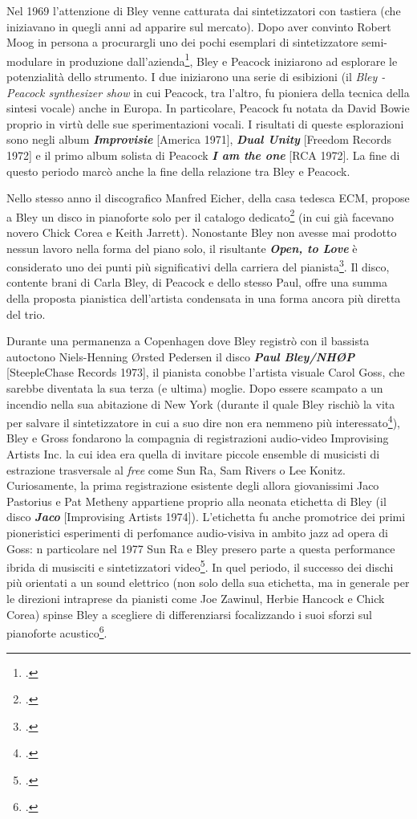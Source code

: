 Nel 1969 l'attenzione di Bley venne catturata dai sintetizzatori con tastiera (che iniziavano in quegli anni ad apparire sul mercato). Dopo aver convinto Robert Moog in persona a procurargli uno dei pochi esemplari di sintetizzatore semi-modulare in produzione dall'azienda\footcite[110]{stopping}, Bley e Peacock iniziarono ad esplorare le potenzialità dello strumento. I due iniziarono una serie di esibizioni (il \textit{Bley - Peacock synthesizer show} in cui Peacock, tra l'altro, fu pioniera della tecnica della sintesi vocale) anche in Europa. In particolare, Peacock fu notata da David Bowie proprio in virtù delle sue sperimentazioni vocali. I risultati di queste esplorazioni sono negli album \textbf{\textit{Improvisie}} [America 1971], \textit{\textbf{Dual Unity}} [Freedom Records 1972] e il primo album solista di Peacock \textit{\textbf{I am the one}} [RCA 1972]. La fine di questo periodo marcò anche la fine della relazione tra Bley e Peacock.\par
Nello stesso anno il discografico Manfred Eicher, della casa tedesca ECM, propose a Bley un disco in pianoforte solo per il catalogo dedicato\footcite[119]{stopping} (in cui già facevano novero Chick Corea e Keith Jarrett). Nonostante Bley non avesse mai prodotto nessun lavoro nella forma del piano solo, il risultante \textit{\textbf{Open, to Love}} è considerato uno dei punti più significativi della carriera del pianista\footcite[75]{cappelletti}. Il disco, contente brani di Carla Bley, di Peacock e dello stesso Paul, offre una summa della proposta pianistica dell'artista condensata in una forma ancora più diretta del trio.\par
Durante una permanenza a Copenhagen dove Bley registrò con il bassista autoctono Niels-Henning Ørsted Pedersen il disco \textit{\textbf{Paul Bley/NHØP}} [SteepleChase Records 1973], il pianista conobbe l'artista visuale Carol Goss, che sarebbe diventata la sua terza (e ultima) moglie. Dopo essere scampato a un incendio nella sua abitazione di New York (durante il quale Bley rischiò la vita per salvare il sintetizzatore in cui a suo dire non era nemmeno più interessato\footcite[120]{stopping}), Bley e Gross fondarono la compagnia di registrazioni audio-video Improvising Artists Inc. la cui idea era quella di invitare piccole ensemble di musicisti di estrazione trasversale al \textit{free} come Sun Ra, Sam Rivers o Lee Konitz. Curiosamente, la prima registrazione esistente degli allora giovanissimi Jaco Pastorius e Pat Metheny appartiene proprio alla neonata etichetta di Bley (il disco \textit{\textbf{Jaco}} [Improvising Artists 1974]). L'etichetta fu anche promotrice dei primi pioneristici esperimenti di perfomance audio-visiva in ambito jazz ad opera di Goss: n particolare nel 1977 Sun Ra e Bley presero parte a questa performance ibrida di musisciti e sintetizzatori video\footcite[129]{stopping}. In quel periodo, il successo dei dischi più orientati a un sound elettrico (non solo della sua etichetta, ma in generale per le direzioni intraprese da pianisti come Joe Zawinul, Herbie Hancock e Chick Corea) spinse Bley a scegliere di differenziarsi focalizzando i suoi sforzi sul pianoforte acustico\footcite[127]{stopping}. \par
